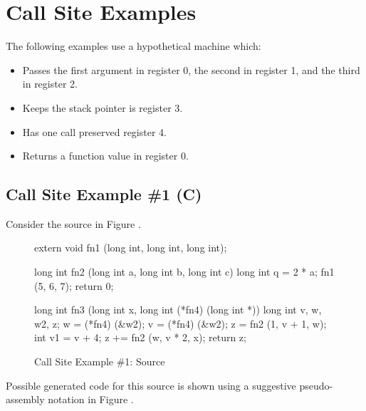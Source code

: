 \clearpage
\section{Call Site Examples}
\label{app:callsiteexamples}
The following examples use a hypothetical machine which: 
\begin{itemize}
\item
Passes the first argument in register 0, the second in register 1, and the third in register 2.
\item
Keeps the stack pointer is register 3.
\item
Has one call preserved register 4.
\item
Returns a function value in register 0.
\end{itemize}

\subsection{Call Site Example \#1 (C)}
Consider the  source in Figure .

\begin{figure}[ht]
\begin{nlnlisting}

extern void fn1 (long int, long int, long int);

long int
fn2 (long int a, long int b, long int c) 
{
    long int q = 2 * a;
    fn1 (5, 6, 7); 
    return 0;
}
 
long int
fn3 (long int x, long int (*fn4) (long int *))
{
    long int v, w, w2, z;
    w = (*fn4) (&w2);
    v = (*fn4) (&w2);
    z = fn2 (1, v + 1, w);
    {
        int v1 = v + 4;
        z += fn2 (w, v * 2, x);
    }
    return z;
}
\end{nlnlisting}
\caption{Call Site Example \#1: Source}
\label{fig:callsiteexample1source}
\end{figure}

Possible generated code for this source is shown using a suggestive 
pseudo-\linebreak[0]assembly notation in Figure .

